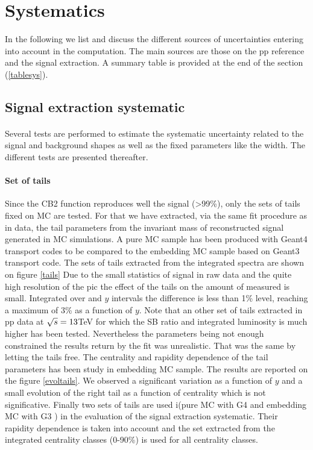 \graphicspath{{Figures/Systematics/}}

\section{Systematics}

In the following we list and discuss the different sources of uncertainties entering into account in the \Raa computation. 
The main sources are those on the pp reference and the signal extraction.
A summary table is provided at the end of the section (\ref{tablesys}).

\subsection{\label{sysSigExtr}Signal extraction systematic}

\paragraph{}
Several tests are performed to estimate the systematic uncertainty related to the signal and background shapes as well as the fixed parameters like the \upsp width.
The different tests are presented thereafter.
 
\paragraph{Set of tails}
Since the CB2 function reproduces well the signal (>99\%), only the sets of tails fixed on MC are tested.
For that we have extracted, via the same fit procedure as in data, the tail parameters from the invariant mass of reconstructed \ups signal generated in MC simulations.
A pure \ups MC sample has been produced with Geant4 transport codes to be compared to the embedding MC sample based on Geant3 transport code.
The sets of tails extracted from the integrated spectra are shown on figure \ref{tails}
Due to the small statistics of signal in raw data and the quite high resolution of the pic the effect of the tails on the amount of measured \ups is small.
Integrated over \pt and $y$ intervals the difference is less than 1\% level, reaching a maximum of 3\% as a function of $y$.
Note that an other set of tails extracted in pp data at $\sqrt{s}=13$\;TeV for which the S\/B ratio and integrated luminosity is much higher has been tested.
Nevertheless the parameters being not enough constrained the results return by the fit was unrealistic.
That was the same by letting the tails free.
The centrality and rapidity dependence of the tail parameters has been study in embedding MC sample.
The results are reported on the figure \ref{evoltails}.
We observed a significant variation as a function of $y$ and a small evolution of the right tail as a function of centrality which is not significative.
Finally two sets of tails are used i(pure \ups MC with G4 and embedding MC with G3 ) in the evaluation of the signal extraction systematic.
Their rapidity dependence is taken into account and the set extracted from the integrated centrality classes (0-90\%) is used for all centrality classes.

